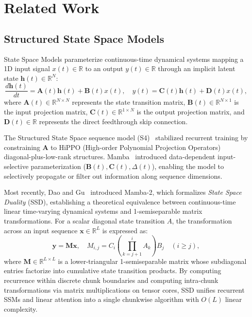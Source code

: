 \documentclass[conference]{IEEEtran}
\begin{document}
\section{Related Work}
\label{sec:related_work}

\subsection{Structured State Space Models}
State Space Models parameterize continuous-time dynamical systems mapping a 1D input signal $x(t) \in \mathbb{R}$ to an output $y(t) \in \mathbb{R}$ through an implicit latent state $\mathbf{h}(t) \in \mathbb{R}^N$:
\begin{equation}
\label{eq:continuous_ssm}
\frac{d\mathbf{h}(t)}{dt} = \mathbf{A}(t)\mathbf{h}(t) + \mathbf{B}(t)x(t), \quad y(t) = \mathbf{C}(t)\mathbf{h}(t) + \mathbf{D}(t)x(t),
\end{equation}
where $\mathbf{A}(t) \in \mathbb{R}^{N \times N}$ represents the state transition matrix, $\mathbf{B}(t) \in \mathbb{R}^{N \times 1}$ is the input projection matrix, $\mathbf{C}(t) \in \mathbb{R}^{1 \times N}$ is the output projection matrix, and $\mathbf{D}(t) \in \mathbb{R}$ represents the direct feedthrough skip connection.

The Structured State Space sequence model (S4)~\cite{gu2022efficiently} stabilized recurrent training by constraining $\mathbf{A}$ to HiPPO (High-order Polynomial Projection Operators) diagonal-plus-low-rank structures. Mamba~\cite{gu2023mamba} introduced data-dependent input-selective parameterization ($\mathbf{B}(t), \mathbf{C}(t), \Delta(t)$), enabling the model to selectively propagate or filter out information along sequence dimensions. 

Most recently, Dao and Gu~\cite{dao2024transformers} introduced Mamba-2, which formalizes \textit{State Space Duality} (SSD), establishing a theoretical equivalence between continuous-time linear time-varying dynamical systems and 1-semiseparable matrix transformations. For a scalar diagonal state transition $A$, the transformation across an input sequence $\mathbf{x} \in \mathbb{R}^L$ is expressed as:
\begin{equation}
\label{eq:ssd_matrix}
\mathbf{y} = \mathbf{M}\mathbf{x}, \quad M_{i,j} = C_i \left( \prod_{k=j+1}^i A_k \right) B_j \quad (i \ge j),
\end{equation}
where $\mathbf{M} \in \mathbb{R}^{L \times L}$ is a lower-triangular 1-semiseparable matrix whose subdiagonal entries factorize into cumulative state transition products. By computing recurrence within discrete chunk boundaries and computing intra-chunk transformations via matrix multiplications on tensor cores, SSD unifies recurrent SSMs and linear attention into a single chunkwise algorithm with $O(L)$ linear complexity.
\end{document}
